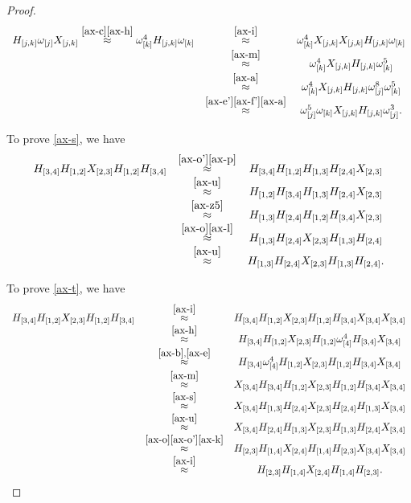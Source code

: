 \documentclass{dalthesis}
\theoremstyle{theorem}
\theoremstyle{definition}
\theoremstyle{definition}  %
\theoremstyle{definition}
\newcommand{\jay}{j}
\newcommand{\kay}{k}
\renewcommand{\:}{\mathbin{:}}
\begin{document}
\begin{proof}
\[\begin{array}{ccc}
H_{[\jay,\kay]}\omega_{[\jay]}X_{[\jay,\kay]}\stackrel{\eqref{ax-c}\eqref{ax-h}}{\approx}\omega^4_{[\kay]}H_{[\jay,\kay]}\omega_{[\kay]}&\stackrel{\eqref{ax-i}}{\approx}&\omega^4_{[\kay]}X_{[\jay,\kay]}X_{[\jay,\kay]}H_{[\jay,\kay]}\omega_{[\kay]}\\&\stackrel{\eqref{ax-m}}{\approx}&\omega^4_{[\kay]}X_{[\jay,\kay]}H_{[\jay,\kay]}\omega^5_{[\kay]}\\&\stackrel{\eqref{ax-a}}{\approx}&\omega^4_{[\kay]}X_{[\jay,\kay]}H_{[\jay,\kay]}\omega^8_{[\jay]}\omega^5_{[\kay]}\\&\stackrel{\eqref{ax-e'}\eqref{ax-f'}\eqref{ax-a}}{\approx}&\omega^5_{[\jay]}\omega_{[\kay]}X_{[\jay,\kay]}H_{[\jay,\kay]}\omega^3_{[\jay]}.\\
\end{array}
\]
      
  To prove \eqref{ax-s}, we have
  \[
\begin{array}{ccc}  
  H_{[3,4]} H_{[1,2]}X_{[2,3]}H_{[1,2]}H_{[3,4]}
    &\stackrel{\eqref{ax-o'}\eqref{ax-p}}{\approx}&
    H_{[3,4]} H_{[1,2]}H_{[1,3]}H_{[2,4]}X_{[2,3]}\\
    &\stackrel{\eqref{ax-u}}{\approx}&
    H_{[1,2]} H_{[3,4]}H_{[1,3]}H_{[2,4]}X_{[2,3]}\\
    &\stackrel{\eqref{ax-z5}}{\approx}&
    H_{[1,3]}H_{[2,4]}H_{[1,2]} H_{[3,4]}X_{[2,3]}\\
    &\stackrel{\eqref{ax-o}\eqref{ax-l}}{\approx}&H_{[1,3]}H_{[2,4]}X_{[2,3]}H_{[1,3]} H_{[2,4]}\\
    &\stackrel{\eqref{ax-u}}{\approx}&
    H_{[1,3]}H_{[2,4]}X_{[2,3]}H_{[1,3]} H_{[2,4]}.\\
\end{array}    
    \]
  
  To prove \eqref{ax-t}, we have
  \[
\begin{array}{ccc}
  H_{[3,4]} H_{[1,2]}X_{[2,3]}H_{[1,2]}H_{[3,4]}
    &\stackrel{\eqref{ax-i}}{\approx}&
    H_{[3,4]} H_{[1,2]}X_{[2,3]}H_{[1,2]}H_{[3,4]}X_{[3,4]}X_{[3,4]}\\
    &\stackrel{\eqref{ax-h}}{\approx}&
    H_{[3,4]} H_{[1,2]}X_{[2,3]}H_{[1,2]}\omega^4_{[4]}H_{[3,4]}X_{[3,4]}\\
    &\stackrel{\eqref{ax-b},\eqref{ax-e}}{\approx}&
    H_{[3,4]} \omega^4_{[4]}H_{[1,2]}X_{[2,3]}H_{[1,2]}H_{[3,4]}X_{[3,4]}\\
    &\stackrel{\eqref{ax-m}}{\approx}&
    X_{[3,4]}H_{[3,4]}H_{[1,2]}X_{[2,3]}H_{[1,2]}H_{[3,4]}X_{[3,4]}\\
    &\stackrel{\eqref{ax-s}}{\approx}&
    X_{[3,4]}H_{[1,3]}H_{[2,4]}X_{[2,3]} H_{[2,4]} H_{[1,3]}X_{[3,4]}\\
    &\stackrel{\eqref{ax-u}}{\approx}&
    X_{[3,4]}H_{[2,4]}H_{[1,3]}X_{[2,3]} H_{[1,3]} H_{[2,4]}X_{[3,4]}\\
    &\stackrel{\eqref{ax-o}\eqref{ax-o'}\eqref{ax-k}}{\approx}&
    H_{[2,3]}H_{[1,4]}X_{[2,4]} H_{[1,4]} H_{[2,3]}X_{[3,4]}X_{[3,4]}\\
    &\stackrel{\eqref{ax-i}}{\approx}&
    H_{[2,3]}H_{[1,4]}X_{[2,4]} H_{[1,4]} H_{[2,3]}.\\    
    \end{array}
\]
\end{proof}
\end{document}
